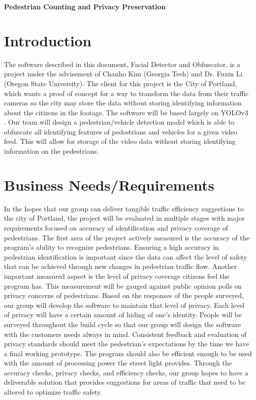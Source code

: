 \documentclass[onecolumn, draftclsnofoot,10pt, compsoc]{IEEEtran}
\def \CapstoneProjectName{		Pedestrian Counting and Privacy Preservation}
\begin{document}
\clearpage
\centering
\textbf{\Huge\CapstoneProjectName}\par
\raggedright
\section{Introduction}
The software described in this document, Facial Detector and Obfuscator, is a project under the advisement of Chanho Kim (Georgia Tech) and Dr. Fuxin Li (Oregon State University). The client for this project is the City of Portland, which wants a proof of concept for a way to transform the data from their traffic cameras so the city may store the data without storing identifying information about the citizens in the footage. The software will be based largely on YOLOv3 \cite{YOLOv3}. Our team will design a pedestrian/vehicle detection model which is able to obfuscate all identifying features of pedestrians and vehicles for a given video feed. This will allow for storage of the video data without storing identifying information on the pedestrians.


\section{Business Needs/Requirements}
In the hopes that our group can deliver tangible traffic efficiency suggestions to the city of Portland, the project will be evaluated in multiple stages with major requirements focused on accuracy of identification and privacy coverage of pedestrians. The first area of the project actively measured is the accuracy of the program’s ability to recognize pedestrians. Ensuring a high accuracy in pedestrian identification is important since the data can affect the level of safety that can be achieved through new changes in pedestrian traffic flow. Another important measured aspect is the level of privacy coverage citizens feel the program has. This measurement will be gauged against public opinion polls on privacy concerns of pedestrians. Based on the responses of the people surveyed, our group will develop the software to maintain that level of privacy. Each level of privacy will have a certain amount of hiding of one's identity. People will be surveyed throughout the build cycle so that our group will design the software with the customers needs always in mind. Consistent feedback and evaluation of privacy standards should meet the pedestrian’s expectations by the time we have a final working prototype. The program should also be efficient enough to be used with the amount of processing power the street light provides. Through the accuracy checks, privacy checks, and efficiency checks, our group hopes to have a deliverable solution that provides suggestions for areas of traffic that need to be altered to optimize traffic safety.
\end{document}

